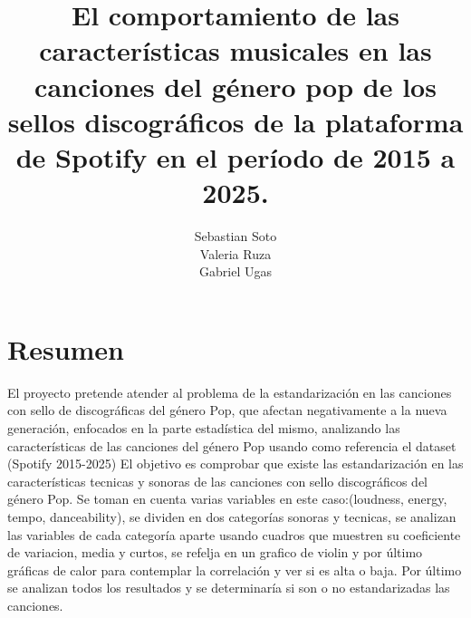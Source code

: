 \documentclass[oneside,11pt]{Latex/Classes/PhDthesisPSnPDF}
\title{El comportamiento de las características musicales en las
canciones del género pop de los sellos discográficos de la plataforma de
Spotify en el período de 2015 a 2025.}
\author{Sebastian Soto \\ Valeria Ruza \\ Gabriel Ugas}
\begin{document}
\maketitle

\frontmatter


\setcounter{secnumdepth}{3}
\setcounter{tocdepth}{3}

\tableofcontents



\cleardoublepage

  \cleardoublepage       %
  \chapter*{Resumen}     %
  
  El proyecto pretende atender al problema de la estandarización en las
canciones con sello de discográficas del género Pop, que afectan
negativamente a la nueva generación, enfocados en la parte estadística
del mismo, analizando las características de las canciones del género
Pop usando como referencia el dataset (Spotify 2015-2025) El objetivo es
comprobar que existe las estandarización en las características tecnicas
y sonoras de las canciones con sello discográficos del género Pop. Se
toman en cuenta varias variables en este caso:(loudness, energy, tempo,
danceability), se dividen en dos categorías sonoras y tecnicas, se
analizan las variables de cada categoría aparte usando cuadros que
muestren su coeficiente de variacion, media y curtos, se refelja en un
grafico de violin y por último gráficas de calor para contemplar la
correlación y ver si es alta o baja. Por último se analizan todos los
resultados y se determinaría si son o no estandarizadas las
canciones.             %
  
  \cleardoublepage

\mainmatter
\def\baselinestretch{1.5}
\end{document}
